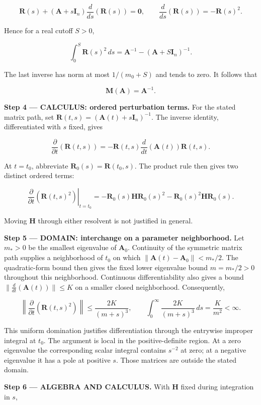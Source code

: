 \documentclass[11pt,oneside,openany]{book}
\begin{document}
\[
\mathbf R(s)+(\mathbf A+s\mathbf I_n)\frac{d}{ds}(\mathbf R(s))=\mathbf0,
\qquad \frac{d}{ds}(\mathbf R(s))=-\mathbf R(s)^2.
\]

Hence for a real cutoff \(S>0\),

\[
\int_0^S\mathbf R(s)^2\,ds
=\mathbf A^{-1}-(\mathbf A+S\mathbf I_n)^{-1}.
\]

The last inverse has norm at most \(1/(m_0+S)\) and tends to zero. It follows that

\[
\mathbf M(\mathbf A)=\mathbf A^{-1}.
\]

\textbf{Step 4 --- CALCULUS: ordered perturbation terms.} For the stated matrix path, set \(\mathbf R(t,s)=(\mathbf A(t)+s\mathbf I_n)^{-1}\). The inverse identity, differentiated with \(s\) fixed, gives

\[
\frac{\partial}{\partial t}(\mathbf R(t,s))
=-\mathbf R(t,s)\frac{d}{dt}(\mathbf A(t))\mathbf R(t,s).
\]

At \(t=t_0\), abbreviate \(\mathbf R_0(s)=\mathbf R(t_0,s)\). The product rule then gives two distinct ordered terms:

\[
\left.\frac{\partial}{\partial t}(\mathbf R(t,s)^2)\right|_{t=t_0}
=-\mathbf R_0(s)\mathbf H\mathbf R_0(s)^2
-\mathbf R_0(s)^2\mathbf H\mathbf R_0(s).
\]

Moving \(\mathbf H\) through either resolvent is not justified in general.

\begin{DomainStep}
\textbf{Step 5 --- DOMAIN: interchange on a parameter neighborhood.} Let \(m_*>0\) be the smallest eigenvalue of \(\mathbf A_0\). Continuity of the symmetric matrix path supplies a neighborhood of \(t_0\) on which \(\|\mathbf A(t)-\mathbf A_0\|<m_*/2\). The quadratic-form bound then gives the fixed lower eigenvalue bound \(m=m_*/2>0\) throughout this neighborhood. Continuous differentiability also gives a bound \(\|\frac{d}{dt}(\mathbf A(t))\|\le K\) on a smaller closed neighborhood. Consequently,

\[
\left\|\frac{\partial}{\partial t}(\mathbf R(t,s)^2)\right\|
\le\frac{2K}{(m+s)^3},\qquad
\int_0^\infty\frac{2K}{(m+s)^3}\,ds=\frac{K}{m^2}<\infty.
\]

This uniform domination justifies differentiation through the entrywise improper integral at \(t_0\). The argument is local in the positive-definite region. At a zero eigenvalue the corresponding scalar integral contains \(s^{-2}\) at zero; at a negative eigenvalue it has a pole at positive \(s\). Those matrices are outside the stated domain.

\end{DomainStep}
\begingroup\color{AlgebraBlue}
\textbf{Step 6 --- ALGEBRA AND CALCULUS.} With \(\mathbf H\) fixed during integration in \(s\),
\end{document}

